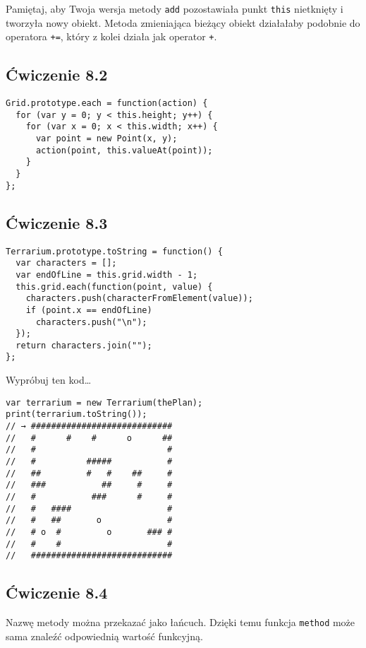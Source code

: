 Pamiętaj, aby Twoja wersja metody \texttt{add} pozostawiała punkt \texttt{this} nietknięty i tworzyła nowy obiekt. Metoda zmieniająca bieżący obiekt działałaby podobnie do operatora \texttt{+=}, który z kolei działa jak operator \texttt{+}.

  
\subsection*{Ćwiczenie 8.2}
\label{sol:8.2}
    
\begin{verbatim} 
Grid.prototype.each = function(action) {
  for (var y = 0; y < this.height; y++) {
    for (var x = 0; x < this.width; x++) {
      var point = new Point(x, y);
      action(point, this.valueAt(point));
    }
  }
};
\end{verbatim}
  
 
\subsection*{Ćwiczenie 8.3}
\label{sol:8.3}
    
\begin{verbatim} 
Terrarium.prototype.toString = function() {
  var characters = [];
  var endOfLine = this.grid.width - 1;
  this.grid.each(function(point, value) {
    characters.push(characterFromElement(value));
    if (point.x == endOfLine)
      characters.push("\n");
  });
  return characters.join("");
};
 \end{verbatim}
    
Wypróbuj ten kod…

    
\begin{verbatim} 
var terrarium = new Terrarium(thePlan);
print(terrarium.toString());
// → ############################
//   #      #    #      o      ##
//   #                          #
//   #          #####           #
//   ##         #   #    ##     #
//   ###           ##     #     #
//   #           ###      #     #
//   #   ####                   #
//   #   ##       o             #
//   # o  #         o       ### #
//   #    #                     #
//   ############################
\end{verbatim}

  
\subsection*{Ćwiczenie 8.4}
\label{sol:8.4}
    
Nazwę metody można przekazać jako łańcuch. Dzięki temu funkcja \texttt{method} może sama znaleźć odpowiednią wartość funkcyjną.

